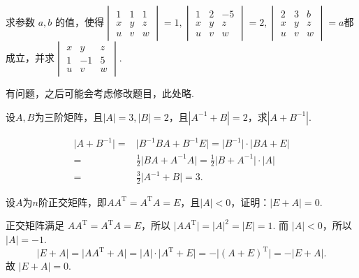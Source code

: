 \begin{exercise}
\begin{exgroup}
        \item 求参数 $a,b$  的值，使得$\begin{vmatrix}1 & 1 & 1 \\ x & y & z \\u & v & w\end{vmatrix}=1,
            \begin{vmatrix}1 & 2 & -5 \\ x & y & z \\u & v & w\end{vmatrix}=2,
            \begin{vmatrix}2 & 3 & b \\ x & y & z \\u & v & w\end{vmatrix}=a$都成立，并求$\begin{vmatrix}x & y & z \\ 1 & -1 & 5 \\u & v & w\end{vmatrix}$.
        \begin{answer}
            有问题，之后可能会考虑修改题目，此处略.
        \end{answer}

        \item 设$A,B$为三阶矩阵，且$|A|=3,|B|=2$，且$|A^{-1}+B|=2$，求$|A+B^{-1}|$.
        \begin{answer}
            \begin{align*}
                \lvert A+B^{-1} \rvert ={} & \lvert B^{-1}BA+B^{-1}E \rvert = \lvert B^{-1} \rvert \cdot \lvert BA+E \rvert                  \\
                ={}                        & \frac{1}{2} \lvert BA+A^{-1}A \rvert = \frac{1}{2} \lvert B+A^{-1} \rvert \cdot \lvert A \rvert \\
                ={}                        & \frac{3}{2} \lvert A^{-1}+B \rvert = 3.
            \end{align*}
        \end{answer}

        \item 设$A$为$n$阶正交矩阵，即$AA^\mathrm{T}=A^\mathrm{T}A=E$，且$|A|<0$，证明：$|E+A|=0$.
        \begin{answer}
            正交矩阵满足 $AA^{\mathrm{T}} = A^{\mathrm{T}}A = E$，所以 $\lvert AA^{\mathrm{T}} \rvert = \lvert A \rvert^2 = \lvert E \rvert = 1$. 而 $\lvert A \rvert < 0$，所以 $\lvert A \rvert = -1$.
            \[\lvert E+A \rvert = \lvert AA^{\mathrm{T}}+A \rvert = \lvert A \rvert \cdot \lvert A^{\mathrm{T}}+E \rvert = -\lvert (A+E)^{\mathrm{T}} \rvert = -\lvert E+A \rvert.\]
            故 $\lvert E+A \rvert = 0$.


\end{answer}
\end{exgroup}
\end{exercise}
